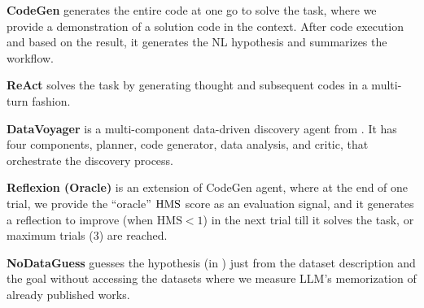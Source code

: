 \begin{ite}
    \item \textbf{CodeGen} generates the entire code at one go to solve the task, where we provide a demonstration of a solution code in the context. After code execution and based on the result, it generates the NL hypothesis and summarizes the workflow.
    \item \textbf{ReAct} \cite{yao2023react} solves the task by generating thought and subsequent codes in a multi-turn fashion.
    \item \textbf{DataVoyager} is a multi-component data-driven discovery agent from \cite{majumder2024data}. It has four components, planner, code generator, data analysis, and critic, that orchestrate the discovery process.
    \item \textbf{Reflexion (Oracle)} \cite{Shinn2023ReflexionLA} is an extension of CodeGen agent, where at the end of one trial, we provide the ``oracle'' $\mathrm{HMS}$ score as an evaluation signal, and it generates a reflection to improve (when $\mathrm{HMS} < 1$) in the next trial till it solves the task, or maximum trials (3) are reached.
    \item \textbf{NoDataGuess} guesses the hypothesis (in \real{}) just from the dataset description and the goal without accessing the datasets where we measure LLM's memorization of already published works.
\end{ite}


